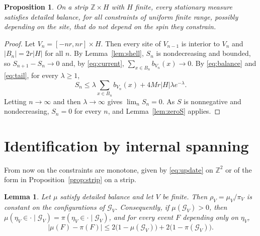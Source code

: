 \documentclass[11pt]{amsart}
\newtheorem{lemma}[theorem]{Lemma}
\newtheorem{proposition}[theorem]{Proposition}
\theoremstyle{remark}
\newcommand{\Z}{\mathbb{Z}}
\begin{document}
\begin{proposition}\label{prop:stripbalance}
On a strip $\Z\times H$ with $H$ finite, every stationary measure satisfies detailed balance, for all constraints
of uniform finite range, possibly depending on the site, that do not depend on the spin they constrain.
\end{proposition}

\begin{proof}
Let $V_n=[-nr,nr]\times H$. Then every site of $V_{n-1}$ is interior to $V_n$ and $|B_n|=2r|H|$ for all $n$. By
Lemma~\ref{lem:shell}, $S_n$ is nondecreasing and bounded, so $S_{n+1}-S_n\to0$ and, by \eqref{eq:current},
$\sum_{x\in B_n}b_{V_n}(x)\to0$. By \eqref{eq:balance} and \eqref{eq:tail}, for every $\lambda\ge1$,
\[
S_n\le\lambda\sum_{x\in B_n}b_{V_n}(x)+4Mr|H|\lambda e^{-\lambda}.
\]
Letting $n\to\infty$ and then $\lambda\to\infty$ gives $\lim_nS_n=0$. As $S$ is nonnegative and nondecreasing,
$S_n=0$ for every $n$, and Lemma~\ref{lem:zeroS} applies.
\end{proof}

\section{Identification by internal spanning}\label{sec:ident}

From now on the constraints are monotone, given by \eqref{eq:update} on $\Z^2$ or of the form in
Proposition~\ref{prop:strip} on a strip.

\begin{lemma}\label{lem:connect}
Let $\mu$ satisfy detailed balance and let $V$ be finite. Then $\rho_V=\mu_V/\pi_V$ is constant on the configurations
of $\mathcal G_V$. Consequently, if $\mu(\mathcal G_V)>0$, then $\mu(\eta_V\in\cdot\mid\mathcal
G_V)=\pi(\eta_V\in\cdot\mid\mathcal G_V)$, and for every event $F$ depending only on $\eta_V$,
\begin{equation}\label{eq:compare}
|\mu(F)-\pi(F)|\le2\bigl(1-\mu(\mathcal G_V)\bigr)+2\bigl(1-\pi(\mathcal G_V)\bigr).
\end{equation}
\end{lemma}
\end{document}
